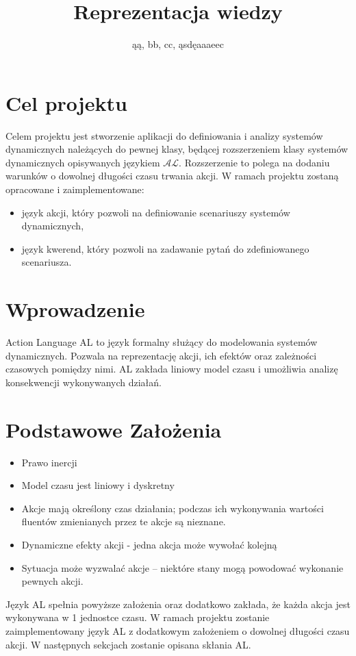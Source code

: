 \documentclass{article}
\title{Reprezentacja wiedzy}
\author{ąą, bb, cc, ąsdęaaaeec}
\begin{document}
\maketitle
\tableofcontents

\section{Cel projektu}
Celem projektu jest stworzenie aplikacji do definiowania i analizy systemów dynamicznych należących do pewnej klasy, będącej rozszerzeniem klasy systemów dynamicznych opisywanych językiem $\mathcal{AL}$.
Rozszerzenie to polega na dodaniu warunków o dowolnej długości czasu trwania akcji. W ramach projektu zostaną opracowane i zaimplementowane:
\begin{itemize}
	\item język akcji, który pozwoli na definiowanie scenariuszy systemów dynamicznych,
	\item język kwerend, który pozwoli na zadawanie pytań do zdefiniowanego scenariusza.
\end{itemize}	

\section{Wprowadzenie}
Action Language AL to język formalny służący do modelowania systemów dynamicznych. Pozwala na reprezentację akcji, ich efektów oraz zależności czasowych pomiędzy nimi. AL zakłada liniowy model czasu i umożliwia analizę konsekwencji wykonywanych działań.

\section{Podstawowe Założenia}
\begin{itemize}
    \item Prawo inercji
    \item Model czasu jest liniowy i dyskretny
    \item Akcje mają określony czas działania; podczas ich wykonywania wartości fluentów zmienianych przez te akcje są nieznane.
    \item Dynamiczne efekty akcji - jedna akcja może wywołać kolejną
    \item Sytuacja może wyzwalać akcje – niektóre stany mogą powodować wykonanie pewnych akcji.
\end{itemize}

Język AL spełnia powyższe założenia oraz dodatkowo zakłada, że każda akcja jest wykonywana w 1 jednostce czasu. W ramach projektu zostanie zaimplementowany język AL z dodatkowym założeniem o dowolnej długości czasu akcji. W następnych sekcjach zostanie opisana skłania AL.
\end{document}

